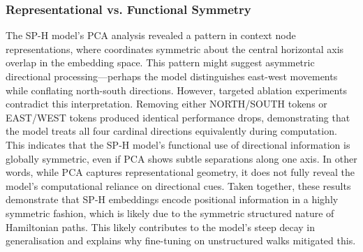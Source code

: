 \subsubsection{Representational vs. Functional Symmetry}

The SP-H model's PCA analysis revealed a pattern in context node representations, where coordinates symmetric about the central horizontal axis overlap in the embedding space. This pattern might suggest asymmetric directional processing—perhaps the model distinguishes east-west movements while conflating north-south directions. However, targeted ablation experiments contradict this interpretation. Removing either NORTH/SOUTH tokens or EAST/WEST tokens produced identical performance drops, demonstrating that the model treats all four cardinal directions equivalently during computation. This indicates that the SP-H model's functional use of directional information is globally symmetric, even if PCA shows subtle separations along one axis. In other words, while PCA captures representational geometry, it does not fully reveal the model's computational reliance on directional cues. Taken together, these results demonstrate that SP-H embeddings encode positional information in a highly symmetric fashion, which is likely due to the symmetric structured nature of Hamiltonian paths. This likely contributes to the model's steep decay in generalisation and explains why fine-tuning on unstructured walks mitigated this. 


